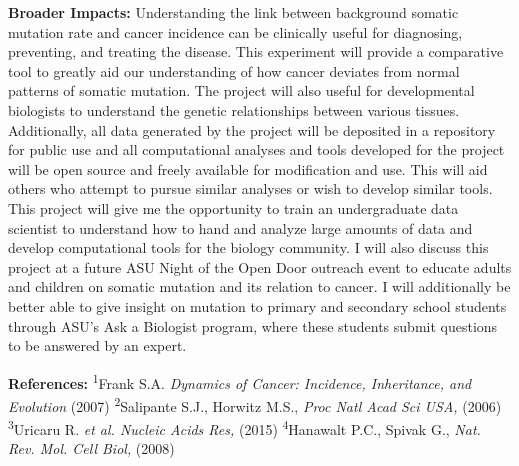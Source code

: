 \documentclass[12pt]{article}
\begin{document}
\textbf{Broader Impacts:}
Understanding the link between background somatic mutation rate and cancer incidence can be clinically useful for diagnosing, preventing, and treating the disease.
This experiment will provide a comparative tool to greatly aid our understanding of how cancer deviates from normal patterns of somatic mutation.
The project will also useful for developmental biologists to understand the genetic relationships between various tissues.
Additionally, all data generated by the project will be deposited in a repository for public use and all computational analyses and tools developed for the project will be open source and freely available for modification and use.
This will aid others who attempt to pursue similar analyses or wish to develop similar tools.
This project will give me the opportunity to train an undergraduate data scientist to understand how to hand and analyze large amounts of data and develop computational tools for the biology community.
I will also discuss this project at a future ASU Night of the Open Door outreach event to educate adults and children on somatic mutation and its relation to cancer.
I will additionally be better able to give insight on mutation to primary and secondary school students through ASU's Ask a Biologist program, where these students submit questions to be answered by an expert.

\begin{footnotesize}
\textbf{References:}
\textsuperscript{1}Frank S.A. \textit{Dynamics of Cancer: Incidence, Inheritance, and Evolution} (2007)
\textsuperscript{2}Salipante S.J., Horwitz M.S., \textit{Proc Natl Acad Sci USA,} (2006)
\textsuperscript{3}Uricaru R. \textit{et al. Nucleic Acids Res,} (2015)
\textsuperscript{4}Hanawalt P.C., Spivak G., \textit{Nat. Rev. Mol. Cell Biol,} (2008)

\end{footnotesize}
\end{document}
